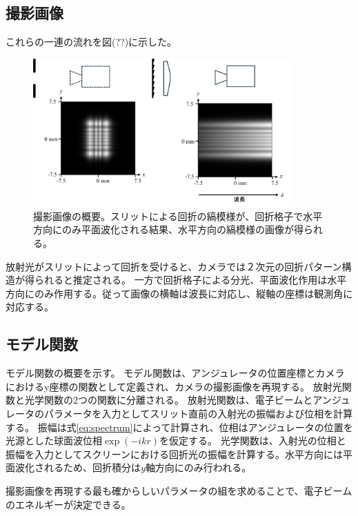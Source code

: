 \documentclass[a4paper,11pt,uplatex]{jsbook}
\begin{document}
\subsection{撮影画像}
これらの一連の流れを図(??)に示した。
\begin{figure}[b]
  \centering
  \includegraphics[width=10cm]{image/2-propagation.png}
  \caption[撮影画像の概要]{撮影画像の概要。スリットによる回折の縞模様が、回折格子で水平方向にのみ平面波化される結果、水平方向の縞模様の画像が得られる。}
\end{figure}
放射光がスリットによって回折を受けると、カメラでは２次元の回折パターン構造が得られると推定される。
一方で回折格子による分光、平面波化作用は水平方向にのみ作用する。従って画像の横軸は波長に対応し、縦軸の座標は観測角に対応する。
\subsection{モデル関数}
モデル関数の概要を示す。
モデル関数は、アンジュレータの位置座標とカメラにおけるy座標の関数として定義され、カメラの撮影画像を再現する。
放射光関数と光学関数の2つの関数に分離される。
放射光関数は、電子ビームとアンジュレータのパラメータを入力としてスリット直前の入射光の振幅および位相を計算する。
振幅は式\ref{eq:spectrum}によって計算され、位相はアンジュレータの位置を光源とした球面波位相$\exp(-ikr)$を仮定する。
光学関数は、入射光の位相と振幅を入力としてスクリーンにおける回折光の振幅を計算する。水平方向には平面波化されるため、回折積分は$y$軸方向にのみ行われる。

撮影画像を再現する最も確からしいパラメータの組を求めることで、電子ビームのエネルギーが決定できる。
\end{document}
